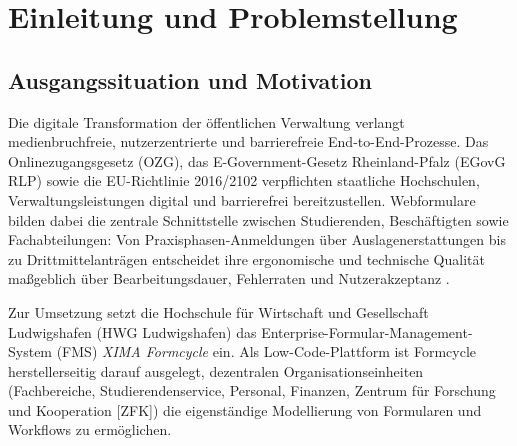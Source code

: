 \chapter{Einleitung und Problemstellung}
\label{chap:einleitung}

\section{Ausgangssituation und Motivation}
\label{sec:ausgangssituation}

Die digitale Transformation der öffentlichen Verwaltung verlangt medienbruchfreie, nutzerzentrierte und barrierefreie End-to-End-Prozesse. Das Onlinezugangsgesetz (OZG), das E-Government-Gesetz Rheinland-Pfalz (EGovG RLP) sowie die EU-Richtlinie 2016/2102 verpflichten staatliche Hochschulen, Verwaltungsleistungen digital und barrierefrei bereitzustellen. Webformulare bilden dabei die zentrale Schnittstelle zwischen Studierenden, Beschäftigten sowie Fachabteilungen: Von Praxisphasen-Anmeldungen über Auslagenerstattungen bis zu Drittmittelanträgen entscheidet ihre ergonomische und technische Qualität maßgeblich über Bearbeitungsdauer, Fehlerraten und Nutzerakzeptanz \parencite{wroblewski2008web, bargas2010usable}.

Zur Umsetzung setzt die Hochschule für Wirtschaft und Gesellschaft Ludwigshafen (HWG Ludwigshafen) das Enterprise-Formular-Management-System (FMS) \textit{XIMA Formcycle} ein. Als Low-Code-Plattform ist Formcycle herstellerseitig darauf ausgelegt, dezentralen Organisationseinheiten (Fachbereiche, Studierendenservice, Personal, Finanzen, Zentrum für Forschung und Kooperation [ZFK]) die eigenständige Modellierung von Formularen und Workflows zu ermöglichen.


